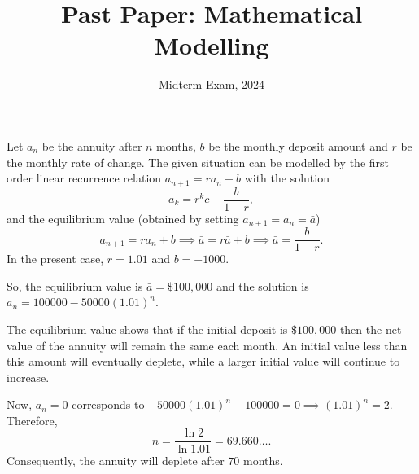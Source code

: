 \documentclass[11pt]{penrose}
\title{Past Paper: Mathematical Modelling}
\subtitle{Midterm Exam, 2024}
\begin{document}
\maketitle
\warningtext

\begin{problem}{1}
    Let $a_{n}$ be the annuity after $n$ months, $b$ be the monthly deposit amount and $r$ be the monthly rate of change. The given situation can be modelled by the first order linear recurrence relation $a_{n+1} = r a_{n} + b$ with the solution
    \begin{equation*}
        a_{k} = r^{k} c + \frac{b}{1-r},
    \end{equation*}
    and the equilibrium value (obtained by setting $a_{n+1} = a_{n} = \bar{a}$)
    \begin{equation*}
        a_{n+1} = r a_{n} + b
        \implies
        \bar{a} = r \bar{a} + b
        \implies
        \bar{a} = \frac{b}{1 - r}.
    \end{equation*}
    In the present case, $r = 1.01$ and $b = -1000$.

    So, the equilibrium value is $\bar{a} = \$ 100,000$ and the solution is $a_{n} = 100000 - 50000 (1.01)^{n}$.

    The equilibrium value shows that if the initial deposit is $\$ 100,000$ then the net value of the annuity will remain the same each month. An initial value less than this amount will eventually deplete, while a larger initial value will continue to increase.

    Now, $a_{n} = 0$ corresponds to $-50000 (1.01)^{n} + 100000 = 0 \implies (1.01)^{n} = 2$. Therefore,
    \begin{equation*}
        n = \frac{ \ln{2} }{ \ln{1.01} } = 69.660\dots.
    \end{equation*}
    Consequently, the annuity will deplete after $70$ months.
\end{problem}
\end{document}
